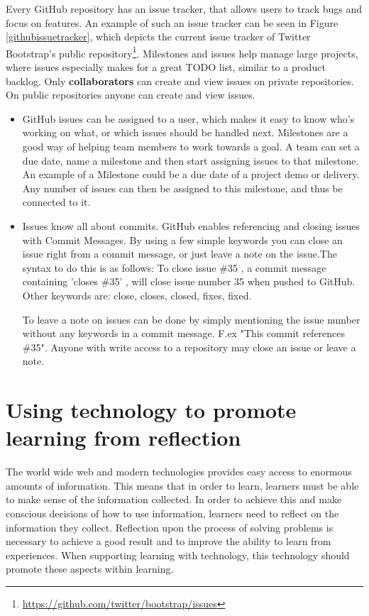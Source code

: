 Every GitHub repository has an issue tracker, that allows users to track bugs and focus on features. An example of such an issue tracker can be seen in Figure \ref{githubissuetracker}, which depicts the current issue tracker of Twitter Bootstrap's public repository\footnote{\url{https://github.com/twitter/bootstrap/issues}}. Milestones and issues help manage large projects, where issues especially makes for a great TODO list, similar to a product backlog. Only {\bf collaborators} can create and view issues on private repositories. On public repositories anyone can create and view issues. 
\begin{itemize}
\item GitHub issues can be assigned to a user, which makes it easy to know who's working on what, or which issues should be handled next. Milestones are a good way of helping team members to work towards a goal. A team can set a due date, name a milestone and then start assigning issues to that milestone. An example of a Milestone could be a due date of a project demo or delivery. Any number of issues can then be assigned to this milestone, and thus be connected to it. 
\item Issues know all about commits. GitHub enables referencing and closing issues with Commit Messages. By using a few simple keywords you can close an issue right from a commit message, or just leave a note on the issue.The syntax to do this is as follows: To close issue \#35 , a commit message containing 'closes \#35' , will close issue number 35 when pushed to GitHub. Other keywords are: close, closes, closed, fixes, fixed. 

To leave a note on issues can be done by simply mentioning the issue number without any keywords in a commit message. F.ex "This commit references \#35". Anyone with write access to a repository may close an issue or leave a note.
\end{itemize}

\section{Using technology to promote learning from reflection}
The world wide web and modern technologies provides easy access to enormous amounts of information. This means that in order to learn, learners must be able to make sense of the information collected.  
In order to achieve this and make conscious decisions of how to use information, learners need to reflect on the information they collect. Reflection upon the process of solving problems is necessary to achieve a good result and to improve the ability to learn from experiences. When supporting learning with technology, this technology should promote these aspects within learning\citep{Lin1999}. 

